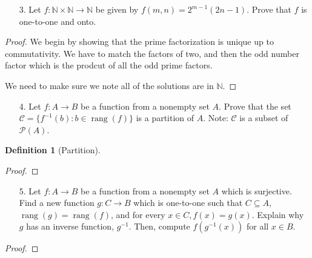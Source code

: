 \documentclass[10pt]{article}
\theoremstyle{definition}
\newtheorem{definition}[equation]{Definition}
\theoremstyle{plain}
\newcommand{\N}{\mathbb{N}}
\DeclareMathOperator\rang{rang}
\begin{document}
\pagebreak



\begin{enumerate}
\item[3.] Let $f: \N \times \N \to \N$ be given by $f(m,n) = 2^{m-1}(2n-1)$.  Prove that $f$ is one-to-one and onto.
\end{enumerate}



\begin{proof}
  We begin by showing that the prime factorization is unique up to commutativity. We have to match the factors of two, and then the odd number factor which is the prodcut of all the odd prime factors.

  We need to make sure we note all of the solutions are in $\N$.
\end{proof}

\pagebreak



\begin{enumerate}
\item[4.] Let $f:A \to B$ be a function from a nonempty set $A$.  Prove that the set $ \mathcal{C} = \{f^{-1}(b): b \in \rang(f)\}$ is a partition of $A$.  Note:  $\mathcal{C}$ is a subset of $\mathscr{P}(A)$.
\end{enumerate}



\setcounter{equation}{0}
\begin{definition}[Partition]

\end{definition}

\begin{proof}

\end{proof}



\pagebreak



\begin{enumerate}
\item[5.] Let $f:A \to B$ be a function from a nonempty set $A$ which is surjective.  Find a new function $g:C \to B$ which is one-to-one such that $C \subseteq A$, $\rang(g) = \rang(f)$, and for every $x \in C, f(x) = g(x)$.  Explain why $g$ has an inverse function, $g^{-1}$.  Then, compute $f(g^{-1}(x))$ for all $x \in B$.
\end{enumerate}



\begin{proof}

\end{proof}
\end{document}
